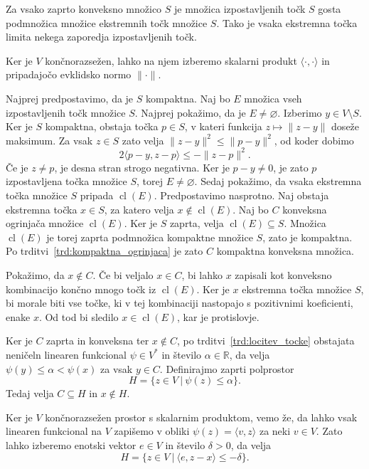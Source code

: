 \documentclass[mat2, tisk]{fmfdelo}
\begin{document}
\begin{izrek}\label{Straszewicz}
  Za vsako zaprto konveksno množico $S$ je
  množica izpostavljenih točk $S$ gosta podmnožica množice ekstremnih točk
  množice $S$. Tako je vsaka ekstremna točka limita nekega zaporedja izpostavljenih
  točk.
\end{izrek}
\begin{dokaz}
Ker je $V$ končnorazsežen, lahko na njem
izberemo skalarni produkt
$\langle\cdot,\cdot\rangle$ in pripadajočo
evklidsko normo $\|\cdot\|$.

Najprej predpostavimo, da je $S$ kompaktna.
Naj bo $E$ množica vseh izpostavljenih točk
množice $S$. 
Najprej pokažimo, da je $E\neq\varnothing$. Izberimo $y\in V\setminus S$.
Ker je $S$ kompaktna, obstaja točka $p\in S$,
v kateri funkcija $z\mapsto\|z-y\|$ doseže maksimum. Za vsak $z\in S$ zato velja
$\|z-y\|^2\leq\|p-y\|^2$, od koder dobimo
\[
2\langle p-y,z-p\rangle\leq-\|z-p\|^2.
\]
Če je $z\neq p$, je desna stran strogo negativna. Ker je $p-y\neq0$,
je zato $p$ izpostavljena točka množice $S$, torej $E\neq\varnothing$.
Sedaj pokažimo, da vsaka
ekstremna točka množice $S$ pripada
$\operatorname{cl}(E)$.
Predpostavimo nasprotno. Naj obstaja ekstremna
točka $x\in S$, za katero velja $x\notin\operatorname{cl}(E)$.
Naj bo $C$ konveksna ogrinjača množice
$\operatorname{cl}(E)$.
Ker je $S$ zaprta, velja
$\operatorname{cl}(E)\subseteq S$.
Množica $\operatorname{cl}(E)$ je torej
zaprta podmnožica kompaktne množice $S$,
zato je kompaktna.
Po trditvi~\ref{trd:kompaktna_ogrinjaca}
je zato $C$ kompaktna konveksna množica.

Pokažimo, da $x\notin C$.
Če bi veljalo $x\in C$, bi lahko $x$
zapisali kot konveksno kombinacijo
končno mnogo točk iz $\operatorname{cl}(E)$.
Ker je $x$ ekstremna točka množice $S$,
bi morale biti vse točke, ki v tej
kombinaciji nastopajo s pozitivnimi
koeficienti, enake $x$.
Od tod bi sledilo $x\in\operatorname{cl}(E)$,
kar je protislovje.

Ker je $C$ zaprta in konveksna ter
$x\notin C$, po
trditvi~\ref{trd:locitev_tocke}
obstajata neničeln linearen
funkcional $\psi\in V^*$ in število
$\alpha\in\mathbb{R}$, da velja
$\psi(y)\leq\alpha<\psi(x)$
za vsak $y\in C$.
Definirajmo zaprti polprostor
\[
H=\{z\in V ~|~ \psi(z)\leq\alpha\}.
\]
Tedaj velja $C\subseteq H$ in $x\notin H$.

Ker je $V$ končnorazsežen prostor s skalarnim
produktom, vemo že, da lahko vsak linearen funkcional
na $V$ zapišemo v obliki
$\psi(z)=\langle v,z\rangle$
za neki $v\in V$.
Zato lahko izberemo enotski vektor $e\in V$
in število $\delta>0$, da velja
\[
H=\{z\in V ~|~ \langle e,z-x\rangle\leq-\delta\}.
\]


\end{dokaz}
\end{document}
